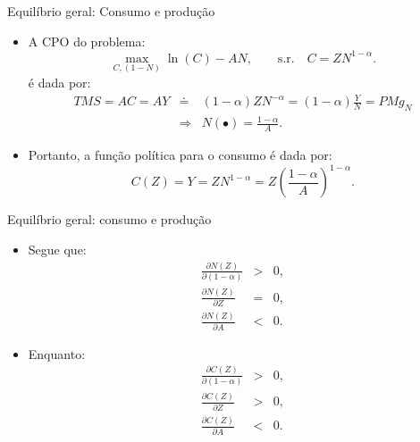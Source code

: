 \documentclass[10pt]{beamer}
\begin{document}
\begin{frame}{Equilíbrio geral: Consumo e produção}
    \begin{itemize}
        \item A CPO do problema:
        \begin{equation}
            \max_{C, (1-N)} \ln (C) - AN, \qquad \text{s.r.} \quad C = ZN^{1-\alpha}. \label{eq9}
        \end{equation}
        é dada por:
        \begin{eqnarray*}
        TMS = AC = AY &\doteq& (1-\alpha)ZN^{-\alpha} = (1-\alpha)\frac{Y}{N} = PMg_N \\
        &\Rightarrow& N(\bullet) = \frac{1-\alpha}{A}.
        \end{eqnarray*}
        \bigskip
        \item Portanto, a função política para o consumo é dada por:
        \[
        C(Z) = Y = ZN^{1-\alpha} = Z\left(\frac{1-\alpha}{A} \right)^{1-\alpha}.
        \]
    \end{itemize}
\end{frame}

\begin{frame}{Equilíbrio geral: consumo e produção}
    \begin{itemize}
        \item Segue que:
        \begin{eqnarray*}
        \frac{\partial N(Z)}{\partial (1-\alpha)} &>& 0, \\
        \frac{\partial N(Z)}{\partial Z} &=& 0, \\
        \frac{\partial N(Z)}{\partial A} &<& 0.
        \end{eqnarray*}
        \bigskip
        \item Enquanto:
        \begin{eqnarray*}
        \frac{\partial C(Z)}{\partial (1-\alpha)} &>& 0, \\
        \frac{\partial C(Z)}{\partial Z} &>& 0, \\
        \frac{\partial C(Z)}{\partial A} &<& 0.
        \end{eqnarray*}
    \end{itemize}
\end{frame}
\end{document}
